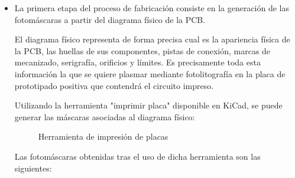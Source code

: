 \begin{itemize}
    \item La primera etapa del proceso de fabricación consiste en la generación de las fotomáscaras a partir del diagrama físico de la PCB.
    
    El diagrama físico representa de forma precisa cual es la apariencia física de la PCB, las huellas de sus componentes, pistas de conexión, marcas de mecanizado, serigrafía, orificios y límites. Es precisamente toda esta información la que se quiere plasmar mediante fotolitografía en la placa de prototipado positiva que contendrá el circuito impreso.
    
    Utilizando la herramienta "imprimir placa" disponible en KiCad, se puede generar las máscaras asociadas al diagrama físico:
    
    \begin{figure}[htbp]
    \centering
    \caption{Herramienta de impresión de placas} \label{fig:lego}
    \end{figure}
    
    Las fotomáscaras obtenidas tras el uso de dicha herramienta son las siguientes:
    

\end{itemize}
